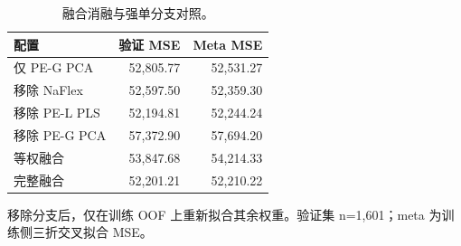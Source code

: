 \begin{table}[t]
\centering
\caption{融合消融与强单分支对照。}
\label{tab:fusion-ablation-zh}
\small
\setlength{\tabcolsep}{3pt}
\begin{tabular*}{\columnwidth}{@{\extracolsep{\fill}}lrr@{}}
\hline
配置 & 验证 MSE & Meta MSE \\
\hline
仅 PE-G PCA & 52,805.77 & 52,531.27 \\
移除 NaFlex & 52,597.50 & 52,359.30 \\
移除 PE-L PLS & 52,194.81 & 52,244.24 \\
移除 PE-G PCA & 57,372.90 & 57,694.20 \\
等权融合 & 53,847.68 & 54,214.33 \\
完整融合 & 52,201.21 & 52,210.22 \\
\hline
\end{tabular*}
\par\smallskip
\begin{minipage}{\columnwidth}\scriptsize
移除分支后，仅在训练 OOF 上重新拟合其余权重。验证集 n=1,601；meta 为训练侧三折交叉拟合 MSE。
\end{minipage}
\end{table}
